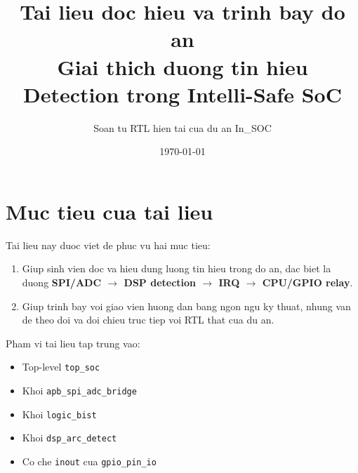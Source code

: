 \documentclass[12pt,a4paper]{article}
\title{Tai lieu doc hieu va trinh bay do an\\[4pt]
\Large Giai thich duong tin hieu Detection trong Intelli-Safe SoC}
\author{Soan tu RTL hien tai cua du an In\_SOC}
\date{\today}
\begin{document}
\maketitle
\tableofcontents
\newpage

\section{Muc tieu cua tai lieu}
Tai lieu nay duoc viet de phuc vu hai muc tieu:
\begin{enumerate}[label=\arabic*.]
    \item Giup sinh vien doc va hieu dung luong tin hieu trong do an, dac biet la duong \textbf{SPI/ADC $\rightarrow$ DSP detection $\rightarrow$ IRQ $\rightarrow$ CPU/GPIO relay}.
    \item Giup trinh bay voi giao vien huong dan bang ngon ngu ky thuat, nhung van de theo doi va doi chieu truc tiep voi RTL that cua du an.
\end{enumerate}

Pham vi tai lieu tap trung vao:
\begin{itemize}
    \item Top-level \texttt{top\_soc}
    \item Khoi \texttt{apb\_spi\_adc\_bridge}
    \item Khoi \texttt{logic\_bist}
    \item Khoi \texttt{dsp\_arc\_detect}
    \item Co che \texttt{inout} cua \texttt{gpio\_pin\_io}
\end{itemize}
\end{document}
